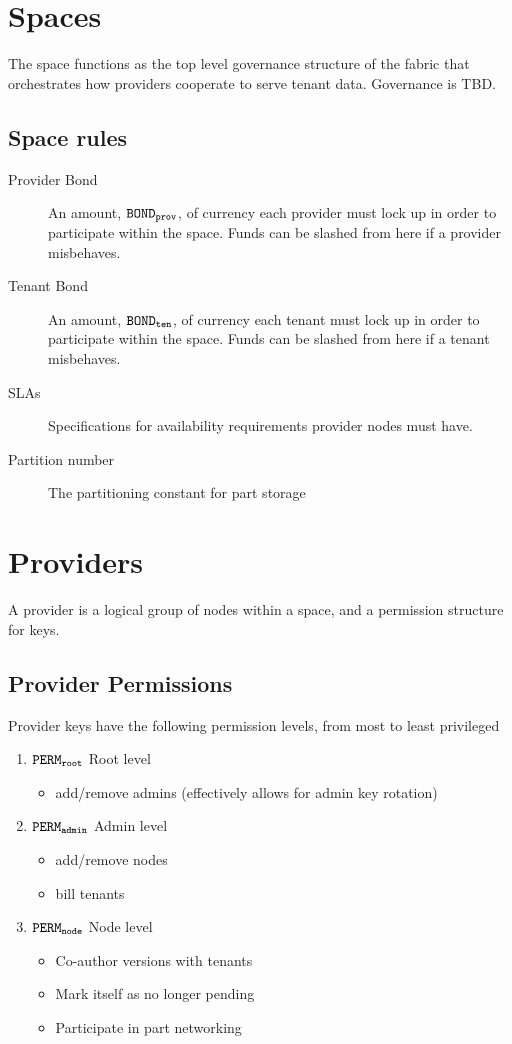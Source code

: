 \documentclass{article}
\begin{document}
\section{Spaces}

The space functions as the top level governance structure of the fabric that orchestrates how providers cooperate to serve tenant data. 
Governance is TBD.

\subsection{Space rules}
\begin{description}
  \item[Provider Bond] An amount, $\mathtt{BOND_{prov}}$, of currency each provider must lock up in order to participate within the space. Funds can be slashed from here if a provider misbehaves.
  \item[Tenant Bond] An amount, $\mathtt{BOND_{ten}}$, of currency each tenant must lock up in order to participate within the space. Funds can be slashed from here if a tenant misbehaves.
  \item[SLAs] Specifications for availability requirements provider nodes must have.
  \item[Partition number] The partitioning constant for part storage
\end{description}

\section{Providers}

A provider is a logical group of nodes within a space, and a permission structure for keys.

\subsection{Provider Permissions}
Provider keys have the following permission levels, from most to least privileged

\begin{enumerate}
  \item $\mathtt{PERM_{root}}$ Root level
    \begin{itemize}
      \item add/remove admins (effectively allows for admin key rotation)
    \end{itemize}
  \item $\mathtt{PERM_{admin}}$ Admin level
    \begin{itemize}
      \item add/remove nodes
      \item bill tenants
    \end{itemize}
  \item $\mathtt{PERM_{node}}$ Node level
    \begin{itemize}
      \item Co-author versions with tenants
      \item Mark itself as no longer pending
      \item Participate in part networking
    \end{itemize}
\end{enumerate}
\end{document}
